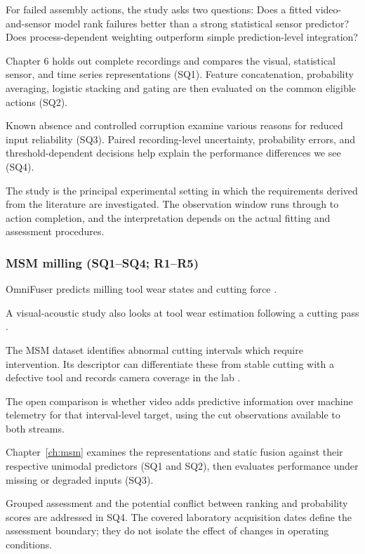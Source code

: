 For failed assembly actions, the study asks two questions: Does a fitted video-and-sensor model rank
failures better than a strong statistical sensor predictor? Does process-dependent weighting
outperform simple prediction-level integration?

Chapter 6 holds out complete recordings and compares the visual, statistical sensor, and time series
representations (SQ1). Feature concatenation, probability averaging, logistic stacking and gating
are then evaluated on the common eligible actions (SQ2).

Known absence and controlled corruption examine various reasons for reduced input reliability (SQ3).
Paired recording-level uncertainty, probability errors, and threshold-dependent decisions help
explain the performance differences we see (SQ4).

The study is the principal experimental setting in which the requirements derived from the
literature are investigated. The observation window runs through to action completion, and the
interpretation depends on the actual fitting and assessment procedures.

\subsubsection*{MSM milling (SQ1--SQ4; R1--R5)}

OmniFuser predicts milling tool wear states and cutting force \parencite[PDF p.~11, Tables~IV--V]{P021}.

A visual-acoustic study also looks at tool wear estimation following a cutting pass \parencite[PDF
p.~24, Table~1]{P045}.

The MSM dataset identifies abnormal cutting intervals which require intervention. Its descriptor can
differentiate these from stable cutting with a defective tool and records camera coverage in the lab
\parencite{Kim2026MSM}.

The open comparison is whether video adds predictive information over machine telemetry for that
interval-level target, using the cut observations available to both streams.

Chapter~\ref{ch:msm} examines the representations and static fusion against their respective
unimodal predictors (SQ1 and SQ2), then evaluates performance under missing or degraded inputs
(SQ3).

Grouped assessment and the potential conflict between ranking and probability scores are addressed
in SQ4. The covered laboratory acquisition dates define the assessment boundary; they do not isolate
the effect of changes in operating conditions.

